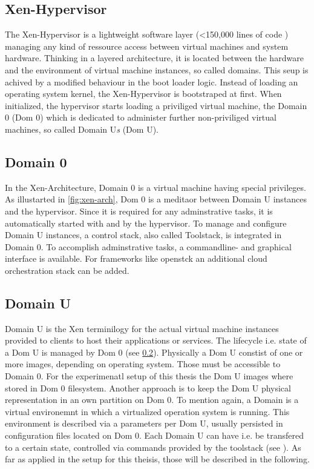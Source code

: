\subsection{Xen-Hypervisor}
The Xen-Hypervisor is a lightweight software layer (<150,000 lines of code \cite{xenprjct}) managing any kind of ressource access between virtual machines and system hardware. Thinking in a layered architecture, it is located between the hardware and the environment of virtual machine instances, so called domains. This seup is achived by a modified behaviour in the boot loader logic. Instead of loading an operating system kernel, the Xen-Hypervisor is bootstraped at first. When initialized, the hypervisor starts loading a priviliged virtual machine, the Domain 0 (Dom 0)
which is dedicated to administer further non-priviliged virtual machines, so called Domain U{\small \textit{s}} (Dom U).

\subsection{Domain 0}\label{sub:dom0}
In the Xen-Architecture, Domain 0 is a virtual machine having special privileges. As illustarted in \ref{fig:xen-arch}, Dom 0 is a meditaor between Domain U instances and the hypervisor. Since it is required for any adminstrative tasks, it is automatically started with and by the hypervisor. To manage and configure Domain U instances, a control stack, also called Toolstack, is integrated in Domain 0. To accomplish adminstrative tasks, a commandline- and graphical interface is available. For frameworks like \gls{openstck} an additional cloud orchestration stack can be added.

\subsection{Domain U}\label{sub:domu}
Domain U is the Xen terminilogy for the actual virtual machine instances provided to clients to host their applications or services. The lifecycle i.e. state of a Dom U is managed by Dom 0 (see \ref{sub:dom0}). Physically a Dom U constist of one or more images, depending on operating system. Those must be accessible to Domain 0. For the experimenatl setup of this thesis the Dom U images where stored in Dom 0 filesystem. Another approach is to keep the Dom U physical representation in an own partition on Dom 0. To mention again, a Domain is a virtual environemnt in which a virtualized operation system is running. This environment is described via a parameters per Dom U, usually persisted in configuration files located on Dom 0. Each Domain U can have i.e. be transfered to a certain state, controlled via commands provided by the toolstack (see \cite{xenxl}). As far as applied in the setup for this theisis, those will be described in the following.

